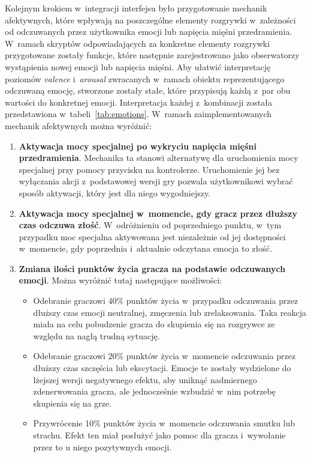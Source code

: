 Kolejnym krokiem w~integracji interfejsu było przygotowanie mechanik afektywnych, które wpływają na poszczególne elementy rozgrywki w~zależności od odczuwanych przez użytkownika emocji lub napięcia mięśni przedramienia. W~ramach skryptów odpowiadających za konkretne elementy rozgrywki przygotowane zostały funkcje, które następnie zarejestrowano jako obserwatorzy wystąpienia nowej emocji lub napięcia mięśni. Aby ułatwić interpretację poziomów \textit{valence} i~\textit{arousal} zwracanych w~ramach obiektu reprezentującego odczuwaną emocję, stworzone zostały stałe, które przypisują każdą z~par obu wartości do konkretnej emocji. Interpretacja każdej z~kombinacji została przedstawiona w~tabeli~\ref{tab:emotions}. W~ramach zaimplementowanych mechanik afektywnych można wyróżnić:
\begin{enumerate}
	\item \textbf{Aktywacja mocy specjalnej po wykryciu napięcia mięśni przedramienia}. Mechanika ta stanowi alternatywę dla uruchomienia mocy specjalnej przy pomocy przycisku na kontrolerze. Uruchomienie jej bez wyłączania akcji z~podstawowej wersji gry pozwala użytkownikowi wybrać sposób aktywacji, który jest dla niego wygodniejszy.
	\item \textbf{Aktywacja mocy specjalnej w~momencie, gdy gracz przez dłuższy czas odczuwa złość}. W~odróżnieniu od poprzedniego punktu, w~tym przypadku moc specjalna aktywowana jest niezależnie od jej dostępności w~momencie, gdy poprzednia i~aktualnie odczytana emocja to złość. 
	\item \textbf{Zmiana ilości punktów życia gracza na podstawie odczuwanych emocji}. Można wyróżnić tutaj następujące możliwości:
	\begin{itemize}
		\item Odebranie graczowi 40\% punktów życia w~przypadku odczuwania przez dłuższy czas emocji neutralnej, zmęczenia lub zrelaksowania. Taka reakcja miała na celu pobudzenie gracza do skupienia się na rozgrywce ze względu na nagłą trudną sytuację.
		\item Odebranie graczowi 20\% punktów życia w~momencie odczuwania przez dłuższy czas szczęścia lub ekscytacji. Emocje te zostały wydzielone do lżejszej wersji negatywnego efektu, aby uniknąć nadmiernego zdenerwowania gracza, ale jednocześnie wzbudzić w~nim potrzebę skupienia się na grze.
		\item Przywrócenie 10\% punktów życia w~momencie odczuwania smutku lub strachu. Efekt ten miał posłużyć jako pomoc dla gracza i~wywołanie przez to u niego pozytywnych emocji.
	\end{itemize}

\end{enumerate}
